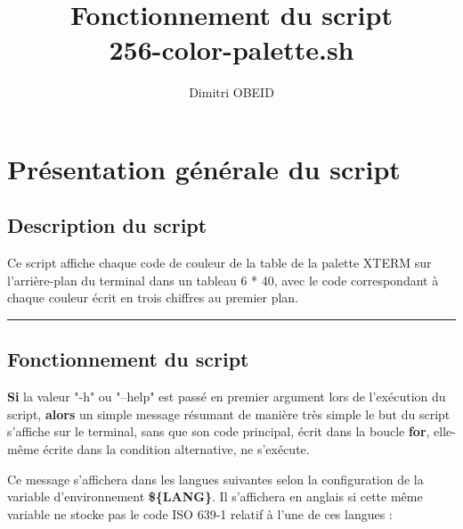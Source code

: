 \documentclass[a4paper,10pt]{article}
\title{\color{sec1}Fonctionnement du script\\ \textbf{\color{sec2}256-color-palette.sh}}\color{text}
\author{Dimitri OBEID}
\begin{document}
    \maketitle
    \newpage

    \hypertarget{contents}{}
    \tableofcontents
    \newpage

    \color{sec1}
    \section{Présentation générale du script}\color{text}

    \color{sec2}
    \subsection{Description du script}\color{text}

    \begin{justify}
        Ce script affiche chaque code de couleur de la table de la palette XTERM sur l'arrière-plan du terminal dans un tableau 6 * 40, avec le code correspondant à chaque couleur écrit en trois chiffres au premier plan.
    \end{justify}




    \color{sec2}\par\noindent\rule{\textwidth}{0.4pt}\color{text}

    \color{sec2}
    \subsection{Fonctionnement du script}\color{text}

    \begin{justify}
        \textbf{\color{cond}Si} la valeur "-h" ou "--help" est passé en premier argument lors de l'exécution du script, \textbf{\color{cond}alors} un simple message résumant de manière très simple le but du script s'affiche sur le terminal, sans que son code principal, écrit dans la boucle \textbf{\color{loop}for}, elle-même écrite dans la condition alternative, ne s'exécute.
    \end{justify}

    \begin{justify}
        Ce message s'affichera dans les langues suivantes selon la configuration de la variable d'environnement \textbf{\color{vars}\$\{LANG\}}. Il s'affichera en anglais si cette même variable ne stocke pas le code ISO 639-1 relatif à l'une de ces langues :
    \end{justify}
\end{document}
